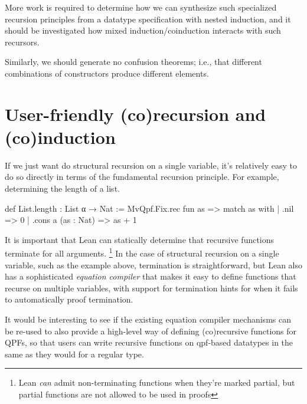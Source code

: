 More work is required to determine how we can synthesize such specialized recursion principles from
a datatype specification with nested induction, and it should be investigated how mixed induction/coinduction
interacts with such recursors.

Similarly, we should generate no confusion theorems; i.e., that different combinations of constructors
produce different elements.



\section{User-friendly (co)recursion and (co)induction}
If we just want do structural recursion on a single variable, it's relatively easy to do so directly
in terms of the fundamental recursion principle.
For example, determining the length of a list.
\begin{leancode}
def List.length : List α → Nat :=
  MvQpf.Fix.rec fun as => match as with
    | .nil                => 0
    | .cons a (as : Nat)  => as + 1 
\end{leancode}

It is important that Lean can statically determine that recursive functions terminate for all 
arguments. \footnote{Lean \emph{can} admit non-terminating functions when they're marked partial, but partial functions are not allowed to be used in proofs}
In the case of structural recursion on a single variable, such as the example above, termination is straightforward,
but Lean also has a sophisticated \emph{equation compiler} that makes it easy to define functions that recurse
on multiple variables, with support for termination hints for when it fails to automatically proof
termination.

It would be interesting to see if the existing equation compiler mechanisms can be re-used
to also provide a high-level way of defining (co)recursive functions for QPFs, so that users can write
recursive functions on qpf-based datatypes in the same as they would for a regular \inductive{} type.







